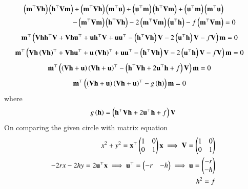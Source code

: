 \documentclass[journal]{IEEEtran}
\begin{document}
\begin{align}
\left(\mathbf{m}^{\top} \mathbf{V} \mathbf{h}\right)\left(\mathbf{h}^{\top} \mathbf{V} \mathbf{m}\right) + \left(\mathbf{m}^{\top} \mathbf{V} \mathbf{h}\right)\left(\mathbf{m}^{\top} \mathbf{u}\right) + \left(\mathbf{u}^{\top} \mathbf{m}\right)\left(\mathbf{h}^{\top} \mathbf{V} \mathbf{m}\right) + \left(\mathbf{u}^{\top} \mathbf{m}\right)\left(\mathbf{m}^{\top} \mathbf{u}\right) \nonumber \\
- \left(\mathbf{m}^{\top}\mathbf{V}\mathbf{m}\right)\left(\mathbf{h}^{\top}\mathbf{V}\mathbf{h}\right) - 2\left(\mathbf{m}^{\top}\mathbf{V}\mathbf{m}\right)\left(\mathbf{u}^{\top}\mathbf{h}\right) - f\left(\mathbf{m}^{\top}\mathbf{V}\mathbf{m}\right) &= 0
\end{align}
\begin{align}
\mathbf{m}^{\top} \left( \mathbf{V}\mathbf{h}\mathbf{h}^{\top}\mathbf{V} + \mathbf{V}\mathbf{h}\mathbf{u}^{\top} + \mathbf{u}\mathbf{h}^{\top}\mathbf{V} + \mathbf{u}\mathbf{u}^{\top} - \left(\mathbf{h}^{\top}\mathbf{V}\mathbf{h}\right)\mathbf{V} - 2\left(\mathbf{u}^{\top}\mathbf{h}\right)\mathbf{V} - f\mathbf{V} \right) \mathbf{m} &= 0
\end{align}
\begin{align}
\mathbf{m}^{\top} \left( \mathbf{V}\mathbf{h}\left(\mathbf{V}\mathbf{h}\right)^\top + \mathbf{V}\mathbf{h}\mathbf{u}^{\top} + \mathbf{u}\left(\mathbf{V}\mathbf{h}\right)^{\top} + \mathbf{u}\mathbf{u}^{\top} - \left(\mathbf{h}^{\top}\mathbf{V}\mathbf{h}\right)\mathbf{V} - 2\left(\mathbf{u}^{\top}\mathbf{h}\right)\mathbf{V} - f\mathbf{V} \right) \mathbf{m} &= 0
\end{align}
\begin{align}
\mathbf{m}^{\top} \left(\left(\mathbf{V}\mathbf{h}+\mathbf{u}\right)\left(\mathbf{V}\mathbf{h}+\mathbf{u}\right)^\top -\left( \mathbf{h}^{\top}\mathbf{V}\mathbf{h} + 2\mathbf{u}^{\top}\mathbf{h} + f\right)\mathbf{V} \right) \mathbf{m} &= 0
\end{align}
\begin{align}
\mathbf{m}^{\top} \left(\left(\mathbf{V}\mathbf{h}+\mathbf{u}\right)\left(\mathbf{V}\mathbf{h}+\mathbf{u}\right)^\top - g\left(\mathbf{h}\right)\right) \mathbf{m} &= 0
\end{align}
where
\begin{align}
g\left(\mathbf{h}\right)=\left( \mathbf{h}^{\top}\mathbf{V}\mathbf{h} + 2\mathbf{u}^{\top}\mathbf{h} + f\right)\mathbf{V} 
\end{align}
On comparing the given circle with matrix equation
\begin{align}
x^2+y^2=\mathbf{x}^\top \begin{pmatrix}1&0\\0&1\end{pmatrix} \mathbf{x} \implies \mathbf{V}=\begin{pmatrix}1&0\\0&1\end{pmatrix}  \\
-2rx-2hy=2\mathbf{u}^\top\mathbf{x} \implies \mathbf{u}^\top=\begin{pmatrix}-r&-h\end{pmatrix}\implies \mathbf{u}=\begin{pmatrix}-r\\-h\end{pmatrix} \\
h^2=f
\end{align}
\end{document}
